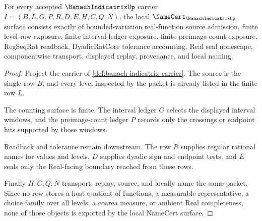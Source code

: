 \begin{theorem}
\label{thm:banach-indicatrix-namecert-obligations}
For every accepted $\BanachIndicatrixUp$ carrier $I=(B,L,G,P,R,D,E,H,C,Q,N)$, the local $\NameCert_{\BanachIndicatrixUp}$ surface consists exactly of bounded-variation real-function source admission, finite level-row exposure, finite interval-ledger exposure, finite preimage-count exposure, RegSeqRat readback, DyadicRatCore tolerance accounting, Real seal nonescape, componentwise transport, displayed replay, provenance, and local naming.
\end{theorem}
\begin{proof}
Project the carrier of \autoref{def:banach-indicatrix-carrier}. The source is the single row $B$, and every level inspected by the packet is already listed in the finite row $L$.

The counting surface is finite. The interval ledger $G$ selects the displayed interval windows, and the preimage-count ledger $P$ records only the crossings or endpoint hits supported by those windows.

Readback and tolerance remain downstream. The row $R$ supplies regular rational names for values and levels, $D$ supplies dyadic sign and endpoint tests, and $E$ seals only the Real-facing boundary reached from those rows.

Finally $H,C,Q,N$ transport, replay, source, and locally name the same packet. Since no row stores a host quotient of functions, a measurable representative, a choice family over all levels, a coarea measure, or ambient Real completeness, none of those objects is exported by the local NameCert surface.
\end{proof}

